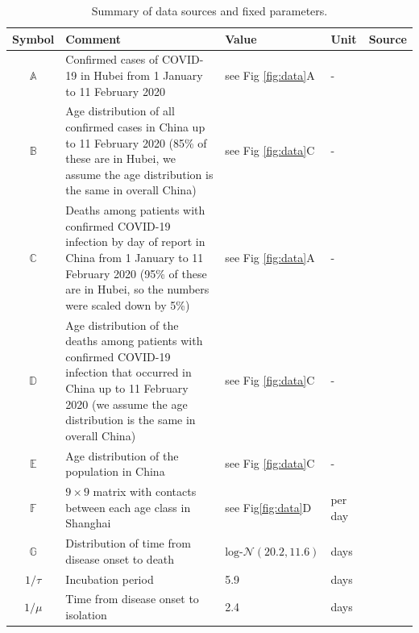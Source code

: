 \documentclass{article}
\begin{document}
	\begin{table}[h]
		\centering
		\caption{Summary of data sources and fixed parameters.}
		\begin{tabular}{cp{7cm}lll}
			\hline
			Symbol & Comment & Value & Unit & Source \\
			\hline 
			$\mathds{A}$ & Confirmed cases of COVID-19 in Hubei from 1 January to 11 February 2020  & see Fig \ref{fig:data}A & - & \cite{Team2020} \\
			$\mathds{B}$ & Age distribution of all confirmed cases in China up to 11 February 2020 (85\% of these are in Hubei, we assume the age distribution is the same in overall China) & see Fig \ref{fig:data}C & - & \cite{Team2020} \\
			$\mathds{C}$ & Deaths among patients with confirmed COVID-19 infection by day of report in China from 1 January to 11 February 2020 (95\% of these are in Hubei, so the numbers were scaled down by 5\%) & see Fig \ref{fig:data}A & - & \cite{Team2020} \\
			$\mathds{D}$ & Age distribution of the deaths among patients with confirmed COVID-19 infection that occurred in China up to 11 February 2020 (we assume the age distribution is the same in overall China) & see Fig \ref{fig:data}C & - & \cite{Team2020} \\
			$\mathds{E}$ & Age distribution of the population in China & see Fig \ref{fig:data}C & - & \cite{Worldometers.info} \\
			$\mathds{F}$ & $9\times 9$ matrix with contacts between each age class in Shanghai &  see Fig\ref{fig:data}D & per day & \cite{Zhang2019} \\  
			$\mathds{G}$ & Distribution of time from disease onset to death & $\text{log-}\mathcal{N}(20.2,11.6)$ & days & \cite{Linton2020a} \\
			$1/\tau$ & Incubation period & 5.9 & days &  \cite{Bi2020} \\
			$1/\mu$ & Time from disease onset to isolation & 2.4 & days & \cite{Bi2020} \\
			\hline 
		\end{tabular} 
	\end{table}
	
\end{document}
